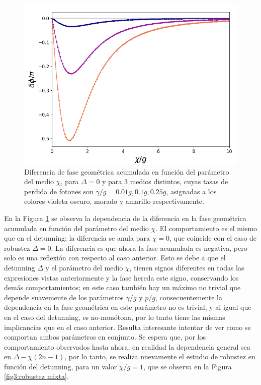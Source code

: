 \begin{figure}[H]
    \begin{minipage}[c]{0.67\textwidth}
        \includegraphics[width=\textwidth]{figuras/ch3/robustez kerr.png}
    \end{minipage}\hfill
    \begin{minipage}[c]{0.3\textwidth}
    \caption{Diferencia de fase geométrica acumulada en función del parámetro del medio $\chi$, para $\Delta=0$ y para 3 medios distintos, cuyas tasas de perdida de fotones son $\gamma/g=0.01g,0.1g,0.25g$, asignadas a los colores violeta oscuro, morado y amarillo respectivamente.}
    \label{fig3:robustez kerr}
  \end{minipage}
\end{figure}
En la Figura \ref{fig3:robustez kerr} se observa la dependencia de la diferencia en la fase geométrica acumulada en función del parámetro del medio $\chi$. El comportamiento es el mismo que en el detunning: la diferencia se anula para $\chi=0$, que coincide con el caso de robustez $\Delta=0$. La diferencia es que ahora la fase acumulada es negativa, pero solo es una reflexión con respecto al caso anterior. Esto se debe a que el detunning $\Delta$ y el parámetro del medio $\chi$, tienen signos diferentes en todas las expresiones vistas anteriormente y la fase hereda este signo, conservando los demás comportamientos; en este caso también hay un máximo no trivial que depende suavemente de los parámetros $\gamma/g$ y $p/g$, consecuentemente la dependencia en la fase geométrica en este parámetro no es trivial, y al igual que en el caso del detunning, es no-monótona, por lo tanto tiene las mismas implicancias que en el caso anterior. Resulta interesante intentar de ver como se comportan ambos parámetros en conjunto. Se espera que, por los comportamiento observados hasta ahora, en realidad la dependencia general sea en $\Delta-\chi(2n-1)$, por lo tanto, se realiza nuevamente el estudio de robustez en función del detunning, para un valor $\chi/g=1$, que se observa en la Figura \ref{fig3:robustez mixta}.
